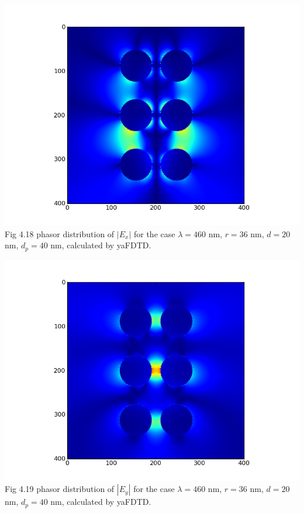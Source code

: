 \documentclass[openany]{book}
\begin{document}
\begin{center}
\includegraphics[scale=0.8]{images/ex-d40.png}\\
Fig 4.18
phasor distribution of $|E_x|$ for the case $\lambda = 460$ nm, $r = 36$ nm, $d = 20$ nm, $d_p = 40$ nm, calculated by yaFDTD.
\end{center}

\begin{center}
\includegraphics[scale=0.8]{images/ey-d40.png}\\
Fig 4.19
phasor distribution of $|E_y|$ for the case $\lambda = 460$ nm, $r = 36$ nm, $d = 20$ nm, $d_p = 40$ nm, calculated by yaFDTD.
\end{center}
\end{document}
